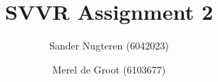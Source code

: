 \documentclass{article}
\begin{document}
\title{SVVR Assignment 2}
\author{Sander Nugteren (6042023) \and Merel de Groot (6103677)}
\renewcommand{\today}{November 17, 2014}
\maketitle

\section{}
\end{document}
